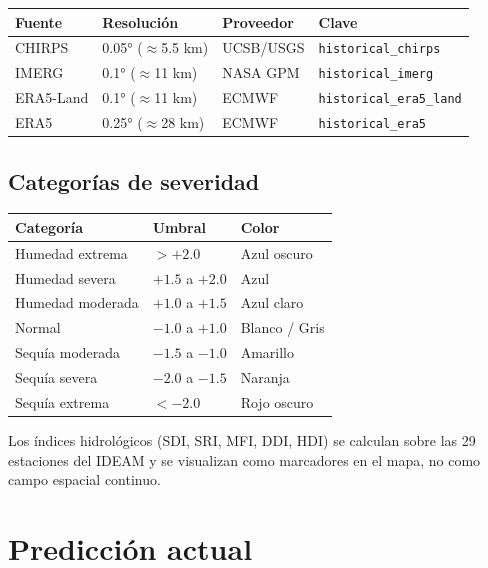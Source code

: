 \begin{center}
\small
\begin{tabular}{@{}llll@{}}
\toprule
\textbf{Fuente} & \textbf{Resolución} & \textbf{Proveedor} & \textbf{Clave} \\
\midrule
CHIRPS    & 0.05° ($\approx$5.5 km)& UCSB/USGS  & \texttt{historical\_chirps} \\
IMERG     & 0.1° ($\approx$11 km) & NASA GPM    & \texttt{historical\_imerg} \\
ERA5-Land & 0.1° ($\approx$11 km) & ECMWF       & \texttt{historical\_era5\_land} \\
ERA5      & 0.25° ($\approx$28 km)& ECMWF       & \texttt{historical\_era5} \\
\bottomrule
\end{tabular}
\end{center}

\subsection{Categorías de severidad}

\begin{center}
\small
\begin{tabular}{@{}lll@{}}
\toprule
\textbf{Categoría} & \textbf{Umbral} & \textbf{Color} \\
\midrule
Humedad extrema  & $>{+2.0}$       & Azul oscuro \\
Humedad severa   & $+1.5$ a $+2.0$ & Azul \\
Humedad moderada & $+1.0$ a $+1.5$ & Azul claro \\
Normal           & $-1.0$ a $+1.0$ & Blanco / Gris \\
Sequía moderada  & $-1.5$ a $-1.0$ & Amarillo \\
Sequía severa    & $-2.0$ a $-1.5$ & Naranja \\
Sequía extrema   & ${<-2.0}$       & Rojo oscuro \\
\bottomrule
\end{tabular}
\end{center}

\begin{remark}
Los índices hidrológicos (SDI, SRI, MFI, DDI, HDI) se calculan sobre las 29 estaciones del IDEAM y se visualizan como marcadores en el mapa, no como campo espacial continuo.
\end{remark}

\section{Predicción actual}
\label{sec:prediccion_actual}

